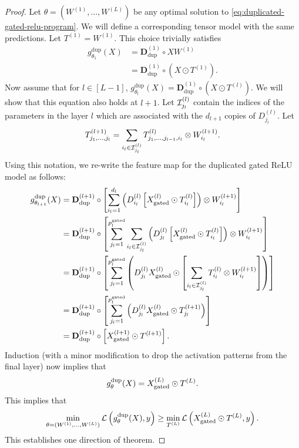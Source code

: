 \convexGatedReLU*
\begin{proof}
    Let \( \theta = (W^{(1)}, \ldots, W^{(L)}) \) be any optimal
    solution to \cref{eq:duplicated-gated-relu-program}.
    We will define a corresponding tensor model with the
    same predictions.
    Let \( T^{(1)} = W^{(1)} \).
    This choice trivially satisfies
    \begin{align*}
        g_{\theta_1}^{\text{dup}}(X)
         & = \mathbf{D}^{(1)}_{\text{dup}} \circ X W^{(1)}          \\
         & = \mathbf{D}^{(1)}_{\text{dup}} \circ (X \odot T^{(1)}).
    \end{align*}
    Now assume that for \( l \in [L-1] \),
    \( g_{\theta_l}^{\text{dup}}(X) = \mathbf{D}^{(1)}_{\text{dup}} \circ (X \odot T^{(l)}) \).
    We will show that this equation also holds at \( l+1 \).
    Let \( \mathcal{I}^{(l)}_{j_l} \) contain the indices of the parameters in the
    layer \( l \) which are associated with the \( d_{l+1} \) copies of
    \( D^{(l)}_{j_l} \).
    Let
    \begin{equation*}
        T^{(l+1)}_{j_1, \ldots, j_l}
        = \sum_{i_l \in \mathcal{I}^{(l)}_{j_l}} T^{(l)}_{j_1, \ldots, j_{l-1}, i_l} \otimes W^{(l+1)}_{i_l}.
    \end{equation*}
    Using this notation, we re-write the feature map
    for the duplicated gated ReLU model as follows:
    \begin{align*}
        g_{\theta_{l+1}}^{\text{dup}}(X)
         & = \mathbf{D}^{(l+1)}_\text{dup} \circ
        \left[\sum_{i_l=1}^{d_l}
            \left(D^{(l)}_{i_l} \left[X^{(l)}_{\text{gated}} \odot T^{(l)}_{i_l}\right]\right)
        \otimes W^{(l+1)}_{i_l}\right]                                                      \\
         & = \mathbf{D}^{(l+1)}_\text{dup} \circ
        \left[\sum_{j_l=1}^{p_l^{\text{gated}}} \sum_{i_l \in \mathcal{I}^{(l)}_{j_l}}
        \left(D^{(l)}_{j_l} \left[X^{(l)}_{\text{gated}} \odot T^{(l)}_{i_l}\right]\right)
        \otimes W^{(l+1)}_{i_l}\right]                                                      \\
         & = \mathbf{D}^{(l+1)}_\text{dup} \circ
        \left[\sum_{j_l=1}^{p_l^{\text{gated}}} \left(D^{(l)}_{j_l} X^{(l)}_{\text{gated}} \odot \left[\sum_{i_l \in \mathcal{I}^{(l)}_{j_l}} T^{(l)}_{i_l}
        \otimes W^{(l+1)}_{i_l}\right]\right)\right]                                                    \\
         & = \mathbf{D}^{(l+1)}_\text{dup} \circ
        \left[\sum_{j_l=1}^{p_l^{\text{gated}}} \left(D^{(l)}_{j_l} X^{(l)}_{\text{gated}} \odot T^{(l+1)}_{j_l}\right)\right] \\
         & = \mathbf{D}^{(l+1)}_\text{dup} \circ \left[X^{(l+1)}_{\text{gated}} \odot T^{(l+1)}\right].
    \end{align*}
    Induction (with a minor modification to drop the activation patterns
    from the final layer) now implies that
    \[
        g_{\theta}^{\text{dup}}(X) = X^{(L)}_{\text{gated}} \odot T^{(L)}.
    \]
    This implies that
    \[
        \min_{\theta = (W^{(1)}, \ldots, W^{(L)})} \mathcal{L}\left(g^{\text{dup}}_{\theta}(X), y\right)
        \geq
        \min_{T^{(L)}} \mathcal{L}\left(X^{(L)}_{\text{gated}} \odot T^{(L)}, y\right).
    \]
    This establishes one direction of theorem.


\end{proof}
